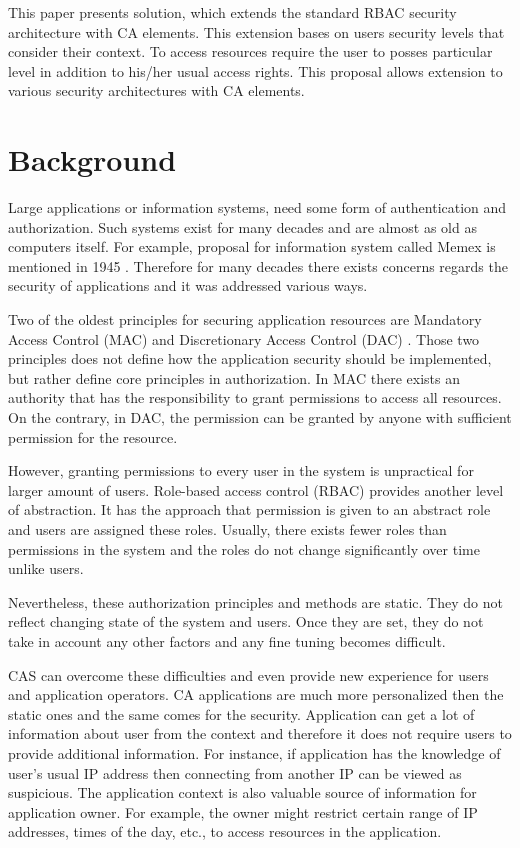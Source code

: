 \documentclass{sig-alternate}
\begin{document}
This paper presents solution, which extends the standard RBAC security architecture with CA elements. This extension bases on users security levels that consider their context. To access resources require the user to posses particular level in addition to his/her usual access rights. This proposal allows extension to various security architectures with CA elements.

\section{Background}
Large applications or information systems, need some form of authentication and authorization. Such systems exist for many decades and are almost as old as computers itself. For example, proposal for information system called Memex is mentioned in 1945 \cite{memex}. Therefore for many decades there exists concerns regards the security of applications and it was addressed various ways.

Two of the oldest principles for securing application resources are Mandatory Access Control (MAC) \cite{accesscontrol} and Discretionary Access Control (DAC) \cite{accesscontrol}. Those two principles does not define how the application security should be implemented, but rather define core principles in authorization. In MAC there exists an authority that has the responsibility to grant permissions to access all resources. On the contrary, in DAC, the permission can be granted by anyone with sufficient permission for the resource.

However, granting permissions to every user in the system is unpractical for larger amount of users. Role-based access control (RBAC) \cite{rbac} provides another level of abstraction. It has the approach that permission is given to an abstract role and users are assigned these roles. Usually, there exists fewer roles than permissions in the system and the roles do not change significantly over time unlike users.

Nevertheless, these authorization principles and methods are static. They do not reflect changing state of the system and users. Once they are set, they do not take in account any other factors and any fine tuning becomes difficult.

CAS can overcome these difficulties and even provide new experience for users and application operators. CA applications are much more personalized then the static ones and the same comes for the security. Application can get a lot of information about user from the context and therefore it does not require users to provide additional information. For instance, if application has the knowledge of user's usual IP address then connecting from another IP can be viewed as suspicious. The application context is also valuable source of information for application owner. For example, the owner might restrict certain range of IP addresses, times of the day, etc., to access resources in the application. 
\end{document}
